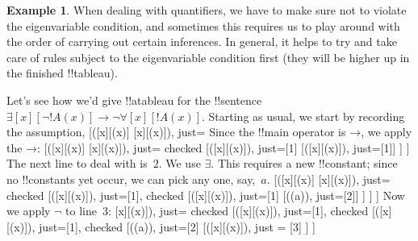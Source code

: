 \documentclass[10pt,a4paper]{article}
\theoremstyle{plain}
\theoremstyle{definition}
\newtheorem{ex}[thm]{Example}
\theoremstyle{remark}
\newenvironment{oltableau}{}{}
\providecommand{\lif}{\mathbin{\rightarrow}}
\providecommand{\lforall}{\mathord{\forall}}
\providecommand{\lexists}{\mathord{\exists}}
\providecommand{\sFmla}[2]{#1(#2)}
\providecommand{\formula}{\relax}
\providecommand{\True}{\top}
\providecommand{\False}{\bot}
\providecommand{\TAss}[1]{}
\providecommand{\TRule}[1]{}
\providecommand{\formula}[1]{#1}
\begin{document}
\begin{ex}
When dealing with quantifiers, we have to make sure not to violate the
eigenvariable condition, and sometimes this requires us to play around
with the order of carrying out certain inferences. In general, it
helps to try and take care of rules subject to the eigenvariable
condition first (they will be higher up in the finished !!{tableau}).

Let's see how we'd give !!a{tableau} for the !!{sentence}
$\lexists[x][\lnot !A(x)] \lif \lnot \lforall[x][!A(x)]$.
Starting as usual, we start by recording the assumption,
\begin{oltableau}
[\sFmla{\False}{\lexists[x][\lnot \formula{A}(x)]\lif \lnot
    \lforall[x][\formula{A}(x)]}, just=\TAss]
\end{oltableau}
Since the !!{main operator} is $\lif$, we apply the
$\TRule{\False}{\lif}$:
\begin{oltableau}
[\sFmla{\False}{\lexists[x][\lnot \formula{A}(x)]\lif \lnot
    \lforall[x][\formula{A}(x)]}, just=\TAss, checked
  [\sFmla{\True}{\lexists[x][\lnot \formula{A}(x)]},
    just={\TRule{\False}{\lif}[1]}
    [\sFmla{\False}{\lnot\lforall[x][\formula{A}(x)]},
      just={\TRule{\False}{\lif}[1]}]
  ]
]
\end{oltableau}
The next line to deal with is~$2$. We use
$\TRule{\True}{\lexists}$. This requires a new !!{constant}; since no
!!{constant}s yet occur, we can pick any one, say,~$a$.
\begin{oltableau}
[\sFmla{\False}{\lexists[x][\lnot \formula{A}(x)]\lif \lnot
    \lforall[x][\formula{A}(x)]}, just=\TAss, checked
  [\sFmla{\True}{\lexists[x][\lnot \formula{A}(x)]},
    just={\TRule{\False}{\lif}[1]}, checked
    [\sFmla{\False}{\lnot\lforall[x][\formula{A}(x)]},
      just={\TRule{\False}{\lif}[1]}
      [\sFmla{\True}{\lnot\formula{A}(a)}, just={\TRule{\True}{\lexists}[2]}]
    ]
  ]
]
\end{oltableau}
Now we apply $\TRule{\False}{\lnot}$ to line~$3$:
\begin{oltableau}
[\sFmla{\False}{\lexists[x][\lnot \formula{A}(x)]\lif \lnot
    \lforall[x][\formula{A}(x)]}, just=\TAss, checked
  [\sFmla{\True}{\lexists[x][\lnot \formula{A}(x)]},
    just={\TRule{\False}{\lif}[1]}, checked
    [\sFmla{\False}{\lnot\lforall[x][\formula{A}(x)]},
      just={\TRule{\False}{\lif}[1]}, checked
      [\sFmla{\True}{\lnot\formula{A}(a)}, just={\TRule{\True}{\lexists}[2]}
        [\sFmla{\True}{\lforall[x][\formula{A}(x)]},
          just = {\TRule{\False}{\lnot}[3]}
        ]
      ]

\end{oltableau}
\end{ex}
\end{document}
